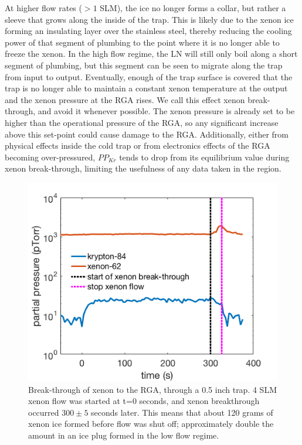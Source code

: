 At higher flow rates ($>1$ SLM), the ice no longer forms a collar, but rather a sleeve that grows along the inside of the trap. This is likely due to the xenon ice forming an insulating layer over the stainless steel, thereby reducing the cooling power of that segment of plumbing to the point where it is no longer able to freeze the xenon. In the high flow regime, the LN will still only boil along a short segment of plumbing, but this segment can be seen to migrate along the trap from input to output. Eventually, enough of the trap surface is covered that the trap is no longer able to maintain a constant xenon temperature at the output and the xenon pressure at the RGA rises. We call this effect xenon break-through, and avoid it whenever possible. The xenon pressure is already set to be higher than the operational pressure of the RGA, so any significant increase above this set-point could cause damage to the RGA. Additionally, either from physical effects inside the cold trap or from electronics effects of the RGA becoming over-pressured, $PP_{Kr}$ tends to drop from its equilibrium value during xenon break-through, limiting the usefulness of any data taken in the region.
\begin{figure}[h!]
\centering
\includegraphics[width=\textwidth]{Figures/xenon_breakthrough.png}
\caption{Break-through of xenon to the RGA, through a 0.5 inch trap. 4 SLM xenon flow was started at t=0 seconds, and xenon breakthrough occurred $300\pm5$ seconds later. This means that about 120 grams of xenon ice formed before flow was shut off; approximately double the amount in an ice plug formed in the low flow regime.}
\label{fig:breakthrough}
\end{figure} 


